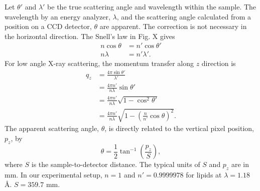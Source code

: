 Let $\theta'$ and $\lambda'$ be the true scattering angle and wavelength
within the sample. The wavelength by an energy analyzer, $\lambda$, and the 
scattering angle calculated from a position on a CCD detector, $\theta$ are 
apparent. The correction is not necessary in the horizontal direction.
The Snell's law in Fig. X gives
\begin{align}
  n\cos\theta &= n'\cos\theta' \\
  n\lambda &= n'\lambda'.
\end{align}
For low angle X-ray scattering, the momentum transfer along $z$ direction is
\begin{align}
  q_z &= \frac{4\pi\sin\theta'}{\lambda'} \\
      &= \frac{4\pi n'}{n\lambda}\sin\theta' \\
      &= \frac{4\pi n'}{n\lambda}\sqrt{1-\cos^2\theta'} \\
      &= \frac{4\pi n'}{n\lambda}\sqrt{1-\left(\frac{n}{n'}\cos\theta\right)^2}.
\end{align}
The apparent scattering angle, $\theta$, is directly related to the vertical
pixel position, $p_z$, by 
\begin{equation}
  \theta = \frac{1}{2}\tan^{-1}\left(\frac{p_z}{S}\right),
\end{equation}
where $S$ is the sample-to-detector distance. The typical units of $S$ and 
$p_z$ are in mm. In our experimental setup,
$n=1$ and $n'=0.9999978$ for lipids at $\lambda=1.18$ \AA. 
$S=359.7$ mm.
